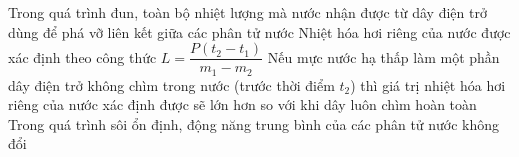 \begin{ex}
		\choiceTFt
		{Trong quá trình đun, toàn bộ nhiệt lượng mà nước nhận được từ dây điện trở dùng để phá vỡ liên kết giữa các phân tử nước}
		{\True Nhiệt hóa hơi riêng của nước được xác định theo công thức $L=\dfrac{P(t_2-t_1)}{m_1-m_2}$}
		{\True Nếu mực nước hạ thấp làm một phần dây điện trở không chìm trong nước (trước thời điểm $t_2$) thì giá trị nhiệt hóa hơi riêng của nước xác định được sẽ lớn hơn so với khi dây luôn chìm hoàn toàn}
		{\True Trong quá trình sôi ổn định, động năng trung bình của các phân tử nước không đổi}
	\end{ex}

